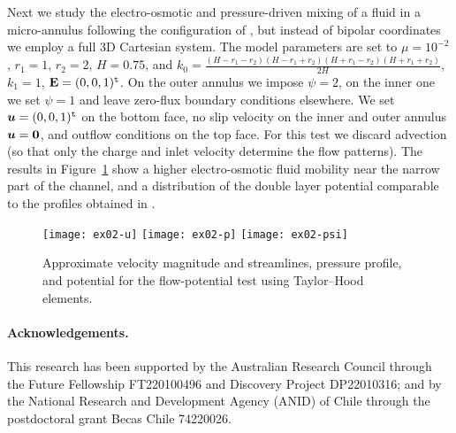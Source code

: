 Next we study the electro-osmotic and pressure-driven mixing of a fluid in a micro-annulus following the configuration of  \cite{akyildiz19}, but instead of bipolar coordinates we employ a full 3D Cartesian system.  The model  parameters are set to $\mu = 10^{-2}$, $r_1 = 1$, $r_2 = 2$, $H = 0.75$, and $k_0 = \frac{(H-r_1-r_2)(H-r_1+r_2)(H+r_1-r_2)(H+r_1+r_2)}{2H}$, $k_1=1$, $\mathbf{E} = (0,0,1)^{\tt t}$. On the outer annulus we impose $\psi = 2$, on the inner one we set $\psi=1$ and leave zero-flux boundary conditions elsewhere. We set $\boldsymbol{u} = (0,0,1)^{\tt t}$ on the bottom face, no slip velocity on the inner and outer annulus $\boldsymbol{u} = \boldsymbol{0}$, and outflow conditions on the top face. For this test we discard advection (so that only the charge and inlet velocity determine the flow patterns). The results in Figure~\ref{fig2} show a higher electro-osmotic fluid mobility near the narrow part of the channel, and a distribution of the double layer potential comparable to the profiles obtained in \cite{akyildiz19}. 


\begin{figure}[t!]
\begin{center}
\texttt{[image: ex02-u]}
\texttt{[image: ex02-p]}
\texttt{[image: ex02-psi]}
\end{center}

\vspace{-0.4cm}
\caption{Approximate velocity magnitude and streamlines, pressure profile, and potential for the flow-potential test using Taylor--Hood elements. }\label{fig2}
\end{figure}


\small
\paragraph{Acknowledgements.} This research has been supported by the Australian Research Council through the {Future Fellowship}   FT220100496 and {Discovery Project}  DP22010316; and by the National Research and Development Agency (ANID) of  Chile through the postdoctoral grant {Becas Chile}  74220026.




